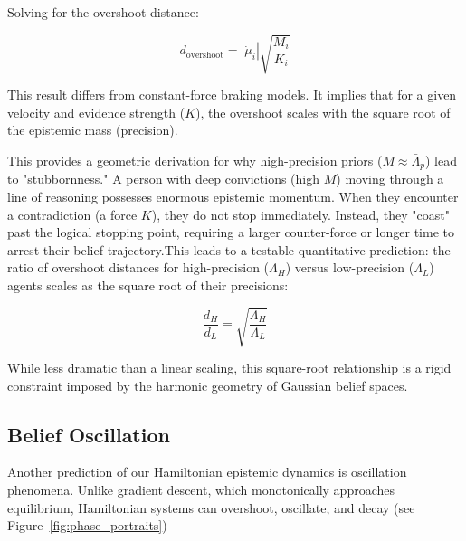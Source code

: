 \documentclass[12pt]{article}
\begin{document}
Solving for the overshoot distance:

\begin{equation}
\boxed{d_{\text{overshoot}} = |\dot{\mu}_i| \sqrt{\frac{M_i}{K_i}}}
\end{equation}

This result differs from constant-force braking models. It implies that for a given velocity and evidence strength ($K$), the overshoot scales with the square root of the epistemic mass (precision).

This provides a geometric derivation for why high-precision priors ($M \approx \bar{\Lambda}_p$) lead to "stubbornness." A person with deep convictions (high $M$) moving through a line of reasoning possesses enormous epistemic momentum. When they encounter a contradiction (a force $K$), they do not stop immediately. Instead, they "coast" past the logical stopping point, requiring a larger counter-force or longer time to arrest their belief trajectory.This leads to a testable quantitative prediction: the ratio of overshoot distances for high-precision ($\Lambda_H$) versus low-precision ($\Lambda_L$) agents scales as the square root of their precisions:

\begin{equation}
\frac{d_H}{d_L} = \sqrt{\frac{\Lambda_H}{\Lambda_L}}
\end{equation}

While less dramatic than a linear scaling, this square-root relationship is a rigid constraint imposed by the harmonic geometry of Gaussian belief spaces.

\subsection{Belief Oscillation}

Another prediction of our Hamiltonian epistemic dynamics is oscillation phenomena. Unlike gradient descent, which monotonically approaches equilibrium, Hamiltonian systems can overshoot, oscillate, and decay (see Figure~\ref{fig:phase_portraits})
\end{document}
